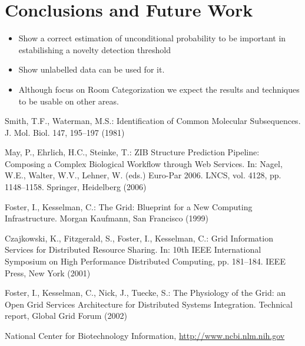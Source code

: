 \documentclass[runningheads,a4paper]{llncs}
\begin{document}
\section{Conclusions and Future Work}
\begin{itemize}
\item Show a correct estimation of unconditional probability to be important in estabilishing a novelty detection threshold
\item Show unlabelled data can be used for it.
\item Although focus on Room Categorization we expect the results and techniques to be usable on other areas.
\end{itemize}

\begin{thebibliography}{4}

 Smith, T.F., Waterman, M.S.: Identification of Common Molecular
Subsequences. J. Mol. Biol. 147, 195--197 (1981)

 May, P., Ehrlich, H.C., Steinke, T.: ZIB Structure Prediction Pipeline:
Composing a Complex Biological Workflow through Web Services. In: Nagel,
W.E., Walter, W.V., Lehner, W. (eds.) Euro-Par 2006. LNCS, vol. 4128,
pp. 1148--1158. Springer, Heidelberg (2006)

 Foster, I., Kesselman, C.: The Grid: Blueprint for a New Computing
Infrastructure. Morgan Kaufmann, San Francisco (1999)

 Czajkowski, K., Fitzgerald, S., Foster, I., Kesselman, C.: Grid
Information Services for Distributed Resource Sharing. In: 10th IEEE
International Symposium on High Performance Distributed Computing, pp.
181--184. IEEE Press, New York (2001)

 Foster, I., Kesselman, C., Nick, J., Tuecke, S.: The Physiology of the
Grid: an Open Grid Services Architecture for Distributed Systems
Integration. Technical report, Global Grid Forum (2002)

 National Center for Biotechnology Information, \url{http://www.ncbi.nlm.nih.gov}

\end{thebibliography}
\end{document}

